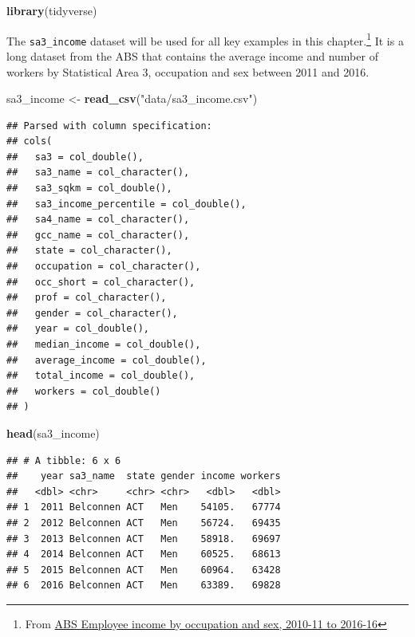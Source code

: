 \documentclass[]{book}
\newenvironment{Shaded}{\begin{snugshade}}{\end{snugshade}}
\newcommand{\KeywordTok}[1]{\textcolor[rgb]{0.13,0.29,0.53}{\textbf{#1}}}
\newcommand{\NormalTok}[1]{#1}
\newcommand{\StringTok}[1]{\textcolor[rgb]{0.31,0.60,0.02}{#1}}
\begin{document}
\begin{Shaded}
\begin{Highlighting}[]
\KeywordTok{library}\NormalTok{(tidyverse)}
\end{Highlighting}
\end{Shaded}

The \texttt{sa3\_income} dataset will be used for all key examples in this chapter.\footnote{From \href{https://www.abs.gov.au/AUSSTATS/abs@.nsf/DetailsPage/6524.0.55.0022011-2016?OpenDocument}{ABS Employee income by occupation and sex, 2010-11 to 2016-16}} It is a long dataset from the ABS that contains the average income and number of workers by Statistical Area 3, occupation and sex between 2011 and 2016.

\begin{Shaded}
\begin{Highlighting}[]
\NormalTok{sa3_income <-}\StringTok{ }\KeywordTok{read_csv}\NormalTok{(}\StringTok{"data/sa3_income.csv"}\NormalTok{)}
\end{Highlighting}
\end{Shaded}

\begin{verbatim}
## Parsed with column specification:
## cols(
##   sa3 = col_double(),
##   sa3_name = col_character(),
##   sa3_sqkm = col_double(),
##   sa3_income_percentile = col_double(),
##   sa4_name = col_character(),
##   gcc_name = col_character(),
##   state = col_character(),
##   occupation = col_character(),
##   occ_short = col_character(),
##   prof = col_character(),
##   gender = col_character(),
##   year = col_double(),
##   median_income = col_double(),
##   average_income = col_double(),
##   total_income = col_double(),
##   workers = col_double()
## )
\end{verbatim}

\begin{Shaded}
\begin{Highlighting}[]
\KeywordTok{head}\NormalTok{(sa3_income)}
\end{Highlighting}
\end{Shaded}

\begin{verbatim}
## # A tibble: 6 x 6
##    year sa3_name  state gender income workers
##   <dbl> <chr>     <chr> <chr>   <dbl>   <dbl>
## 1  2011 Belconnen ACT   Men    54105.   67774
## 2  2012 Belconnen ACT   Men    56724.   69435
## 3  2013 Belconnen ACT   Men    58918.   69697
## 4  2014 Belconnen ACT   Men    60525.   68613
## 5  2015 Belconnen ACT   Men    60964.   63428
## 6  2016 Belconnen ACT   Men    63389.   69828
\end{verbatim}
\end{document}
